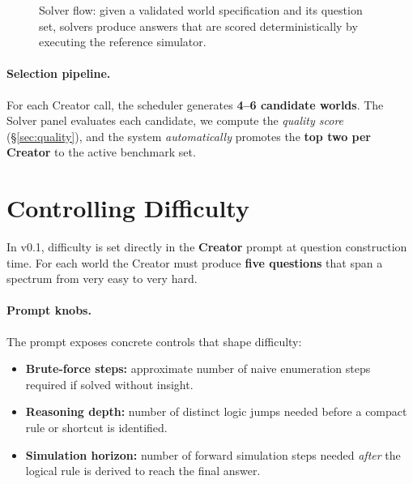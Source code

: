 \documentclass[11pt]{article}
\begin{document}
\begin{figure}[H]
\centering
{}
\caption{Solver flow: given a validated world specification and its question set, solvers produce answers that are scored deterministically by executing the reference simulator.}
\label{fig:solver-flow}
\end{figure}
\FloatBarrier

\paragraph{Selection pipeline.} For each Creator call, the scheduler generates \textbf{4--6 candidate worlds}. The Solver panel evaluates each candidate, we compute the \emph{quality score} (\S\ref{sec:quality}), and the system \emph{automatically} promotes the \textbf{top two per Creator} to the active benchmark set.

\section{Controlling Difficulty}
In v0.1, difficulty is set directly in the \textbf{Creator} prompt at question construction time. For each world the Creator must produce \textbf{five questions} that span a spectrum from very easy to very hard.

\paragraph{Prompt knobs.}
The prompt exposes concrete controls that shape difficulty:
\begin{itemize}
  \item \textbf{Brute-force steps:} approximate number of naive enumeration steps required if solved without insight.
  \item \textbf{Reasoning depth:} number of distinct logic jumps needed before a compact rule or shortcut is identified.
  \item \textbf{Simulation horizon:} number of forward simulation steps needed \emph{after} the logical rule is derived to reach the final answer.
\end{itemize}
\end{document}
